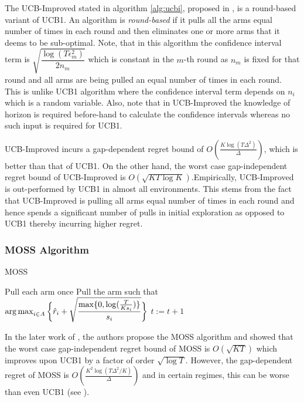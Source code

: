     The UCB-Improved  stated in algorithm \ref{alg:ucbi}, proposed in \citet{auer2010ucb}, is a round-based variant of UCB1. An algorithm is \textit{round-based} if it pulls all the arms equal number of times in each round and then eliminates one or more arms that it deems to be sub-optimal. Note, that in this algorithm the confidence interval term is $\sqrt{\dfrac{\log{( T\epsilon_{m}^{2})}}{2 n_{m}}}$ which is constant in the $m$-th round as $n_m$ is fixed for that round and all arms are being pulled an equal number of times in each round. This is unlike UCB1 algorithm where the confidence interval term depends on $n_i$ which is a random variable. Also, note that in UCB-Improved the knowledge of horizon is required before-hand to calculate the confidence intervals whereas no such input is required for UCB1.
    
    UCB-Improved incurs a gap-dependent regret bound of $O\left(\frac{K\log (T\Delta^{2})}{\Delta}\right)$, which is better than that of UCB1. On the other hand, the worst case gap-independent regret bound of UCB-Improved is $O\left(\sqrt{KT\log K}\right)$.Empirically, UCB-Improved is out-performed by UCB1 in almost all environments. This stems from the fact that UCB-Improved is pulling all arms equal number of times in each round and hence spends a significant number of pulls in initial exploration as opposed to UCB1 thereby incurring higher regret.
        
    
\subsubsection{MOSS Algorithm}    

\begin{algorithm}[!th]
\caption{MOSS}
\label{alg:moss}
\begin{algorithmic}[1]
\State Pull each arm once
\State Pull the arm such that $\operatorname*{arg\,max}_{i\in A}\bigg\lbrace\hat{r}_{i} + \sqrt{\dfrac{\max\lbrace 0,\log(\frac{T}{K s_i})\rbrace}{s_i}}\bigg\rbrace$
\State $t:=t+1 $
 \EndFor
\end{algorithmic}
\end{algorithm}
    
    In the later work of \citet{audibert2009minimax}, the authors propose the MOSS algorithm and showed that the worst case gap-independent regret bound of MOSS is $O\left( \sqrt{KT} \right)$ which improves upon UCB1 by a factor of order $\sqrt{\log T}$. However, the gap-dependent regret of MOSS is $O\left( \frac{K^{2}\log\left(T\Delta^{2}/K\right)}{\Delta}\right)$ and in certain regimes, this can be worse than even UCB1 (see \citet{audibert2009minimax,lattimore2015optimally}).
    
